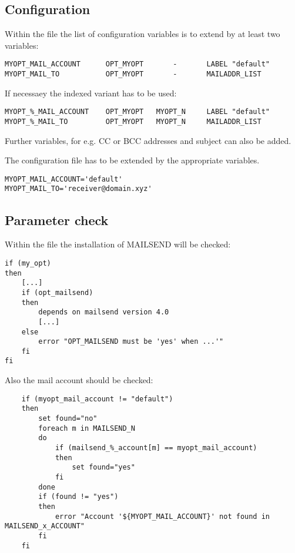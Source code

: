 \subsection{Configuration}
    Within the file  the list of configuration variables 
    is to extend by at least two variables:
\begin{verbatim}
MYOPT_MAIL_ACCOUNT      OPT_MYOPT       -       LABEL "default"
MYOPT_MAIL_TO           OPT_MYOPT       -       MAILADDR_LIST 
\end{verbatim}

    If necessaey the indexed variant has to be used:
\begin{verbatim}
MYOPT_%_MAIL_ACCOUNT    OPT_MYOPT   MYOPT_N     LABEL "default"
MYOPT_%_MAIL_TO         OPT_MYOPT   MYOPT_N     MAILADDR_LIST 
\end{verbatim}
    
    Further variables, for e.g. CC or BCC addresses and subject can also be added.
     
    The configuration file  has to be extended by 
    the appropriate variables.
    
\begin{verbatim}
MYOPT_MAIL_ACCOUNT='default'
MYOPT_MAIL_TO='receiver@domain.xyz' 
\end{verbatim}
     
\subsection{Parameter check}
    Within the file   the installation of MAILSEND will 
    be checked:
  
\begin{verbatim}
if (my_opt)
then
    [...]
    if (opt_mailsend)
    then
        depends on mailsend version 4.0
        [...]
    else
        error "OPT_MAILSEND must be 'yes' when ...'"
    fi
fi
\end{verbatim}

    Also the mail account should be checked:
\begin{verbatim}
    if (myopt_mail_account != "default")
    then
        set found="no"
        foreach m in MAILSEND_N
        do
            if (mailsend_%_account[m] == myopt_mail_account)
            then
                set found="yes" 
            fi
        done
        if (found != "yes")
        then
            error "Account '${MYOPT_MAIL_ACCOUNT}' not found in MAILSEND_x_ACCOUNT"
        fi
    fi
\end{verbatim}

